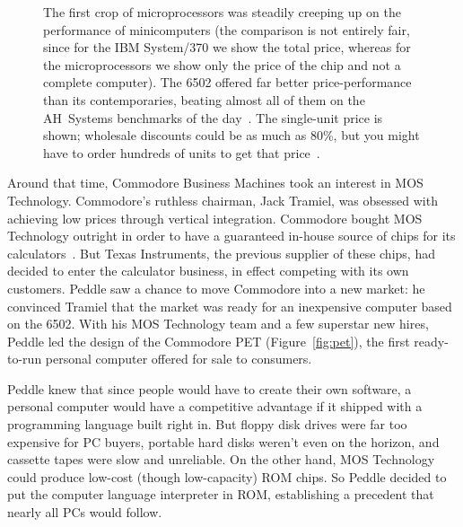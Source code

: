\begin{figure}
  
  \caption{\label{fig:price_performance} 
    The first crop of microprocessors was steadily creeping up on the
    performance of minicomputers (the comparison is not entirely fair,
    since for the IBM System/370 we show the total price, whereas for
    the microprocessors we show only the price of the chip and not a
    complete computer).
    The 6502 offered far better
    price-performance than its contemporaries,
    beating almost all of them on the AH~Systems benchmarks of
    the day~\cite{edn75:6502}.  
    The single-unit price is shown; wholesale discounts could be
    as much as 80\%, but you might have to order hundreds of units to
    get that price~\cite[p. 228]{ceruzzi}.}
\end{figure}



Around that time, Commodore Business Machines took an interest in MOS
Technology.  Commodore's ruthless chairman,
Jack Tramiel, was 
obsessed with achieving low prices through vertical integration.
Commodore bought
MOS Technology outright in order to have a guaranteed in-house source of
chips for its calculators~\cite{commodore}.
But Texas Instruments, the previous supplier of these chips, had decided
to enter the calculator business, in effect competing with its own
customers. 
Peddle saw a chance to move Commodore into a new market: he convinced
Tramiel that the market was ready for an inexpensive computer
based on the 6502.
With his MOS Technology team and a few superstar
new hires, Peddle led the design of the Commodore PET (Figure~\ref{fig:pet}), 
the first ready-to-run personal computer offered for sale to consumers.

Peddle knew that since people would have to create their own software, a
personal computer would have a competitive advantage if it shipped with
a programming language built right in.
But floppy disk drives were far too expensive for PC buyers, portable
hard disks weren't even on the horizon, and cassette tapes were slow and
unreliable.  On the other hand, MOS Technology could produce low-cost
(though low-capacity) ROM 
chips.  So Peddle decided to  put the computer language interpreter in ROM, establishing
a precedent that nearly all PCs would follow.




